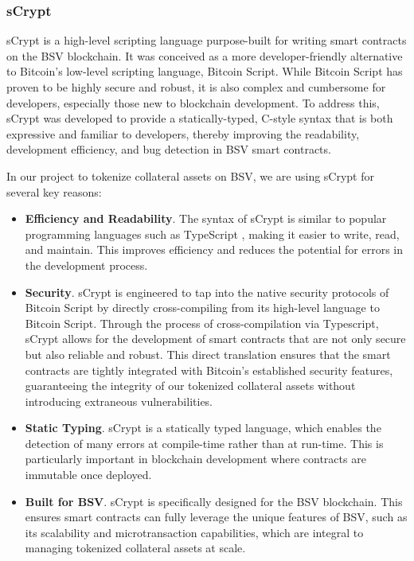 \subsubsection{sCrypt}
\label{subsec:sCrypt}
sCrypt \citep{scrypt_home} is a high-level scripting language purpose-built for writing smart contracts on the BSV blockchain. It was conceived as a more developer-friendly alternative to Bitcoin's low-level scripting language, Bitcoin Script. While Bitcoin Script has proven to be highly secure and robust, it is also complex and cumbersome for developers, especially those new to blockchain development. To address this, sCrypt was developed to provide a statically-typed, C-style syntax that is both expressive and familiar to developers, thereby improving the readability, development efficiency, and bug detection in BSV smart contracts.

In our project to tokenize collateral assets on BSV, we are using sCrypt for several key reasons:

\begin{itemize}
    \item \textbf{Efficiency and Readability}. The syntax of sCrypt is similar to popular programming languages such as TypeScript \citep{typescript_home}, making it easier to write, read, and maintain. This improves efficiency and reduces the potential for errors in the development process.

    \item \textbf{Security}. sCrypt is engineered to tap into the native security protocols of Bitcoin Script by directly cross-compiling from its high-level language to Bitcoin Script. Through the process of cross-compilation via Typescript, sCrypt allows for the development of smart contracts that are not only secure but also reliable and robust. This direct translation ensures that the smart contracts are tightly integrated with Bitcoin's established security features, guaranteeing the integrity of our tokenized collateral assets without introducing extraneous vulnerabilities.
    
    \item \textbf{Static Typing}. sCrypt is a statically typed language, which enables the detection of many errors at compile-time rather than at run-time. This is particularly important in blockchain development where contracts are immutable once deployed.
    
    \item \textbf{Built for BSV}. sCrypt is specifically designed for the BSV blockchain. This ensures smart contracts can fully leverage the unique features of BSV, such as its scalability and microtransaction capabilities, which are integral to managing tokenized collateral assets at scale.
\end{itemize}